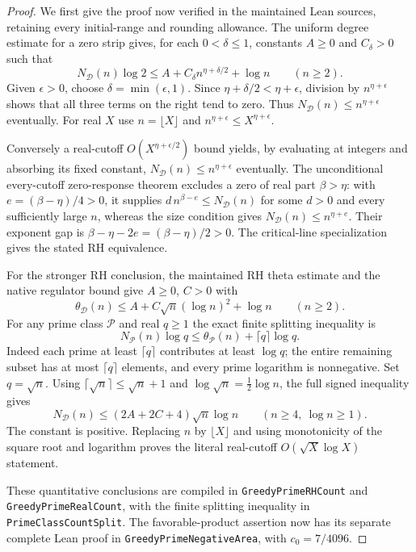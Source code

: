 \documentclass[11pt]{article}
\theoremstyle{definition}
\begin{document}
\begin{proof}
We first give the proof now verified in the maintained Lean sources,
retaining every initial-range and rounding allowance.
The uniform degree estimate for a zero strip gives, for each
$0<\delta\le1$, constants $A\ge0$ and $C_\delta>0$ such that
\[
 N_{\mathcal D}(n)\log2
 \le A+C_\delta n^{\eta+\delta/2}+\log n\qquad(n\ge2).
\]
Given $\epsilon>0$, choose $\delta=\min(\epsilon,1)$.
Since $\eta+\delta/2<\eta+\epsilon$, division by
$n^{\eta+\epsilon}$ shows that all three terms on the right tend
to zero. Thus $N_{\mathcal D}(n)\le n^{\eta+\epsilon}$
eventually. For real $X$ use $n=\lfloor X\rfloor$ and
$n^{\eta+\epsilon}\le X^{\eta+\epsilon}$.

Conversely a real-cutoff $O(X^{\eta+\epsilon/2})$ bound yields,
by evaluating at integers and absorbing its fixed constant,
$N_{\mathcal D}(n)\le n^{\eta+\epsilon}$ eventually.
The unconditional every-cutoff zero-response theorem excludes
a zero of real part $\beta>\eta$: with
$e=(\beta-\eta)/4>0$, it supplies
$d\,n^{\beta-e}\le N_{\mathcal D}(n)$ for some $d>0$
and every sufficiently large $n$, whereas the size condition
gives $N_{\mathcal D}(n)\le n^{\eta+e}$.
Their exponent gap is $\beta-\eta-2e=(\beta-\eta)/2>0$.
The critical-line specialization gives the stated RH equivalence.

For the stronger RH conclusion, the maintained RH theta estimate
and the native regulator bound give $A\ge0$, $C>0$ with
\[
 \theta_{\mathcal D}(n)
 \le A+C\sqrt n(\log n)^2+\log n \qquad(n\ge2).
\]
For any prime class $\mathcal P$ and real $q\ge1$ the exact finite
splitting inequality is
\[
 N_{\mathcal P}(n)\log q
 \le \theta_{\mathcal P}(n)+\lceil q\rceil\log q.
\]
Indeed each prime at least $\lceil q\rceil$ contributes at least
$\log q$; the entire remaining subset has at most
$\lceil q\rceil$ elements, and every prime logarithm is
nonnegative. Set $q=\sqrt n$.
Using $\lceil\sqrt n\rceil\le\sqrt n+1$ and
$\log\sqrt n=\tfrac12\log n$, the full signed inequality gives
\[
 N_{\mathcal D}(n)
 \le (2A+2C+4)\sqrt n\log n
       \qquad(n\ge4,\ \log n\ge1).
\]
The constant is positive. Replacing $n$ by $\lfloor X\rfloor$
and using monotonicity of the square root and logarithm proves
the literal real-cutoff $O(\sqrt X\log X)$ statement.

These quantitative conclusions are compiled in
\texttt{GreedyPrimeRHCount} and \texttt{GreedyPrimeRealCount},
with the finite splitting inequality in
\texttt{PrimeClassCountSplit}.
The favorable-product assertion now has its separate complete Lean
proof in \texttt{GreedyPrimeNegativeArea}, with $c_0=7/4096$.


\end{proof}
\end{document}

